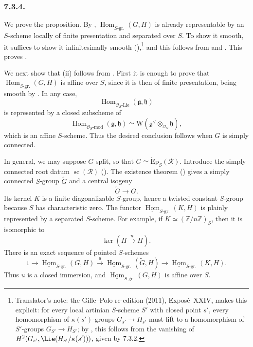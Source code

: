 \subsubsection*{7.3.4.}

We prove the proposition. By ,
\(\underline{\operatorname{Hom}}_{S\text{-}\mathrm{gr.}}(G,H)\) is
already representable by an \(S\)-scheme locally of finite
presentation and separated over \(S\). To show it smooth, it suffices
to show it infinitesimally smooth (),\footnote{Translator's note: the Gille--Polo re-edition (2011), Exposé~XXIV, makes this explicit: for every local artinian \(S\)-scheme \(S'\)
with closed point \(s'\), every homomorphism of \(\kappa(s')\)-groups \(G_{s'}\to H_{s'}\) must lift to
a homomorphism of \(S'\)-groups \(G_{S'}\to H_{S'}\); by
, this follows from the vanishing of
\(H^2(G_{s'},\Lie(H_{s'}/\kappa(s')))\), given by 7.3.2.} and this follows from  and . This proves .

We next show that (ii) follows from . First it is enough to prove
that
\(\underline{\operatorname{Hom}}_{S\text{-}\mathrm{gr.}}(G,H)\) is
affine over \(S\), since it is then of finite presentation, being
smooth by . In any case,
\[
  \underline{\operatorname{Hom}}_{\mathcal O_S\text{-}\mathrm{Lie}}
    (\mathfrak g,\mathfrak h)
\]
is represented by a closed subscheme of
\[
  \underline{\operatorname{Hom}}_{\mathcal O_S\text{-}\mathrm{mod}}
    (\mathfrak g,\mathfrak h)
  \simeq
  \mathrm W\!\left(
    \mathfrak g^\vee\otimes_{\mathcal O_S}\mathfrak h
  \right),
\]
which is an affine \(S\)-scheme. Thus the desired conclusion follows
when \(G\) is simply connected.

In general, we may suppose \(G\) split, so that
\(G\simeq\operatorname{\acute Ep}_S(\mathscr R)\). Introduce the
simply connected root datum \(\operatorname{sc}(\mathscr R)\)
(). The existence theorem () gives a
simply connected \(S\)-group \(\widetilde G\) and a central isogeny
\[
  \widetilde G\longrightarrow G.
\]
Its kernel \(K\) is a finite diagonalizable \(S\)-group, hence a
twisted constant \(S\)-group because \(S\) has characteristic zero.
The functor
\(\underline{\operatorname{Hom}}_{S\text{-}\mathrm{gr.}}(K,H)\) is
plainly represented by a separated \(S\)-scheme. For example, if
\(K\simeq(\mathbb Z/n\mathbb Z)_S\), then it is isomorphic to
\[
  \ker\!\left(H\xrightarrow{\,n\,}H\right).
\]
There is an exact sequence of pointed \(S\)-schemes
\[
  1\longrightarrow
  \underline{\operatorname{Hom}}_{S\text{-}\mathrm{gr.}}(G,H)
  \xrightarrow{u}
  \underline{\operatorname{Hom}}_{S\text{-}\mathrm{gr.}}
    (\widetilde G,H)
  \longrightarrow
  \underline{\operatorname{Hom}}_{S\text{-}\mathrm{gr.}}(K,H).
\]
Thus \(u\) is a closed immersion, and
\(\underline{\operatorname{Hom}}_{S\text{-}\mathrm{gr.}}(G,H)\) is
affine over \(S\).

